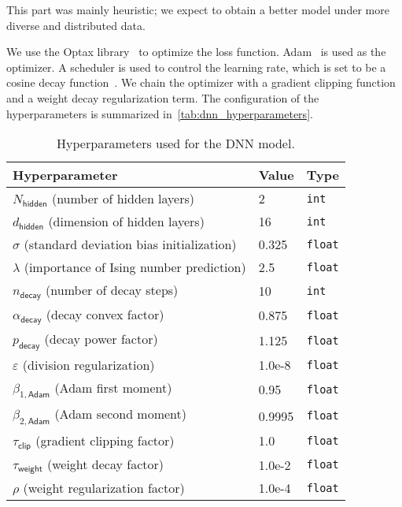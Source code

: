 \documentclass{psu-report}
\begin{document}
This part was mainly heuristic; we expect to obtain a better model under
more diverse and distributed data.

We use the Optax library~\autocite{2020Optax-1} to optimize the loss function.
Adam~\autocite{2014Kin-1} is used as the optimizer.
A scheduler is used to control the learning rate, which is set to
be a cosine decay function~\autocite{2016LosHut-1}.
We chain the optimizer with a gradient clipping function and a weight decay
regularization term.
The configuration of the hyperparameters is summarized
in~\autoref{tab:dnn_hyperparameters}.

\begin{table}[htbp]
    \centering
    \begin{tabular}{lll}
        \hline
        \textbf{Hyperparameter} & \textbf{Value} & \textbf{Type} \\
        \hline
        \(N_\mathsf{hidden}\) (number of hidden layers) &
        2 & \texttt{int} \\
        \(d_\mathsf{hidden}\) (dimension of hidden layers) &
        16 & \texttt{int} \\
        \(\sigma\) (standard deviation bias initialization) &
        0.325 & \texttt{float} \\
        \(\lambda\) (importance of Ising number prediction) &
        2.5 & \texttt{float} \\
        \(n_\mathsf{decay}\) (number of decay steps) &
        10 & \texttt{int} \\
        \(\alpha_\mathsf{decay}\) (decay convex factor) &
        0.875 & \texttt{float} \\
        \(p_\mathsf{decay}\) (decay power factor) &
        1.125 & \texttt{float} \\
        \(\varepsilon\) (division regularization) &
        1.0e-8 & \texttt{float} \\
        \(\beta_{1,\mathsf{Adam}}\) (Adam first moment) &
        0.95 & \texttt{float} \\
        \(\beta_{2,\mathsf{Adam}}\) (Adam second moment) &
        0.9995 & \texttt{float} \\
        \(\tau_\mathsf{clip}\) (gradient clipping factor) &
        1.0 & \texttt{float} \\
        \(\tau_\mathsf{weight}\) (weight decay factor) &
        1.0e-2 & \texttt{float} \\
        \(\rho\) (weight regularization factor) &
        1.0e-4 & \texttt{float} \\
        \hline
    \end{tabular}
    \caption{Hyperparameters used for the DNN model.}
    \label{tab:dnn_hyperparameters}
\end{table}
\end{document}
